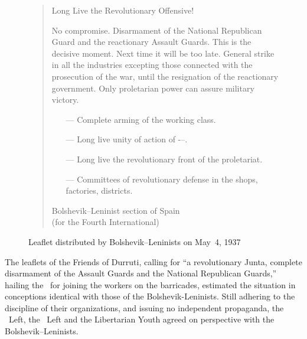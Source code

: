 \begin{figure}

\begin{oframed}
\begin{quote}
  \normalsize

  \bigskip
  
  \begin{center}
  	Long Live the Revolutionary Offensive!
  \end{center}
  
  \bigskip
  
  No compromise. Disarmament of the National Republican Guard and the reactionary Assault Guards. This is the decisive moment. Next time it will be too late. General strike in all the industries excepting those connected with the prosecution of the war, until the resignation of the reactionary government. Only proletarian power can assure military victory.

  \begin{itemize}
  	\raggedright
  	\item[—] Complete arming of the working class.
  	\item[—] Long live unity of action of \CNT-\FAI--\POUM.
  	\item[—] Long live the revolutionary front of the proletariat.
  	\item[—] Committees of revolutionary defense in the shops, factories, districts.
  \end{itemize}

  \medskip
	
  \begin{flushright}
    Bolshevik--Leninist section of Spain \\
    (for the Fourth International)
  \end{flushright}
\end{quote}
\end{oframed}

\caption{Leaflet distributed by Bolshevik--Leninists on May~4, 1937}
\label{fig:bolshlenleaflet}

\end{figure}

The leaflets of the Friends of Durruti, calling for ``a revolutionary Junta, complete disarmament of the Assault Guards and the National Republican Guards,'' hailing the \POUM\ for joining the workers on the barricades, estimated the situation in conceptions identical with those of the Bolshevik-Leninists. Still adhering to the discipline of their organizations, and issuing no independent propaganda, the \POUM\ Left, the \CNT\ Left and the Libertarian Youth agreed on perspective with the Bolshevik--Leninists.

